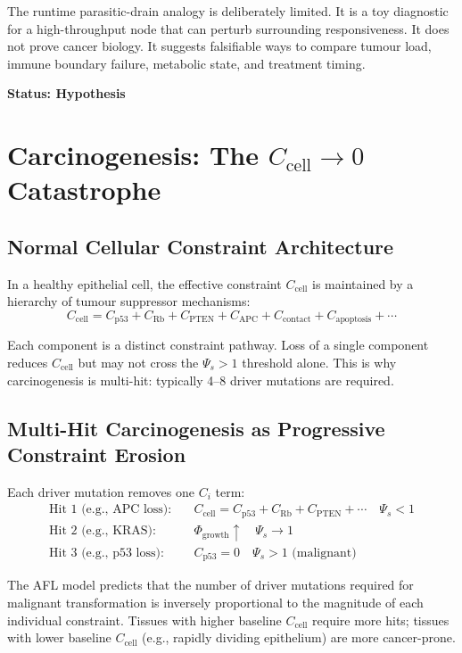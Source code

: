 \documentclass[12pt,a4paper]{article}
\begin{document}
The runtime parasitic-drain analogy is deliberately limited. It is a toy diagnostic for a high-throughput node that can perturb surrounding responsiveness. It does not prove cancer biology. It suggests falsifiable ways to compare tumour load, immune boundary failure, metabolic state, and treatment timing.

\textbf{Status: Hypothesis}

\section{Carcinogenesis: The $C_{\mathrm{cell}} \to 0$ Catastrophe}

\subsection{Normal Cellular Constraint Architecture}

In a healthy epithelial cell, the effective constraint $C_{\mathrm{cell}}$ is maintained by a hierarchy of tumour suppressor mechanisms:
\begin{equation}
    C_{\mathrm{cell}} = C_{\mathrm{p53}} + C_{\mathrm{Rb}} + C_{\mathrm{PTEN}} + C_{\mathrm{APC}} + C_{\mathrm{contact}} + C_{\mathrm{apoptosis}} + \cdots
\end{equation}

Each component is a distinct constraint pathway. Loss of a single component reduces $C_{\mathrm{cell}}$ but may not cross the $\Psi_s > 1$ threshold alone. This is why carcinogenesis is multi-hit: typically 4--8 driver mutations are required.

\subsection{Multi-Hit Carcinogenesis as Progressive Constraint Erosion}

Each driver mutation removes one $C_i$ term:
\begin{align}
    \text{Hit 1 (e.g., APC loss):} & \quad C_{\mathrm{cell}} = C_{\mathrm{p53}} + C_{\mathrm{Rb}} + C_{\mathrm{PTEN}} + \cdots \quad \Psi_s < 1 \\
    \text{Hit 2 (e.g., KRAS):} & \quad \Phi_{\mathrm{growth}} \uparrow \quad \Psi_s \to 1 \\
    \text{Hit 3 (e.g., p53 loss):} & \quad C_{\mathrm{p53}} = 0 \quad \Psi_s > 1 \text{ (malignant)}
\end{align}

The AFL model predicts that the number of driver mutations required for malignant transformation is inversely proportional to the magnitude of each individual constraint. Tissues with higher baseline $C_{\mathrm{cell}}$ require more hits; tissues with lower baseline $C_{\mathrm{cell}}$ (e.g., rapidly dividing epithelium) are more cancer-prone.
\end{document}
